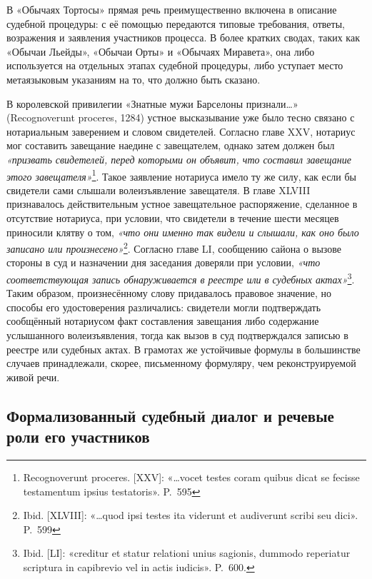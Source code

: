 В «Обычаях Тортосы» прямая речь преимущественно включена в описание судебной процедуры: с её помощью передаются типовые требования, ответы, возражения и заявления участников процесса. В более кратких сводах, таких как «Обычаи Льейды», «Обычаи Орты» и «Обычаях Миравета», она либо используется на отдельных этапах судебной процедуры, либо уступает место метаязыковым указаниям на то, что должно быть сказано.

В королевской привилегии «Знатные мужи Барселоны признали…» (Recognoverunt proceres, 1284) устное высказывание уже было тесно связано с нотариальным заверением и словом свидетелей. Согласно главе XXV, нотариус мог составить завещание наедине с завещателем, однако затем должен был \emph{«призвать свидетелей, перед которыми он объявит, что составил завещание этого завещателя»}\footnote{Recognoverunt proceres. [XXV]: «…vocet testes coram quibus dicat se fecisse testamentum ipsius testatoris». P.~595}. Такое заявление нотариуса имело ту же силу, как если бы свидетели сами слышали волеизъявление завещателя. В главе XLVIII признавалось действительным устное завещательное распоряжение, сделанное в отсутствие нотариуса, при условии, что свидетели в течение шести месяцев приносили клятву о том, \emph{«что они именно так видели и слышали, как оно было записано или произнесено»}\footnote{Ibid. [XLVIII]: «…quod ipsi testes ita viderunt et audiverunt scribi seu dici». P.~599}. Согласно главе LI, сообщению сайона о вызове стороны в суд и назначении дня заседания доверяли при условии, \emph{«что соответствующая запись обнаруживается в реестре или в судебных актах»}\footnote{Ibid. [LI]: «creditur et statur relationi unius sagionis, dummodo reperiatur scriptura in capibrevio vel in actis iudicis». P.~600.}. Таким образом, произнесённому слову придавалось правовое значение, но способы его удостоверения различались: свидетели могли подтверждать сообщённый нотариусом факт составления завещания либо содержание услышанного волеизъявления, тогда как вызов в суд подтверждался записью в реестре или судебных актах. В грамотах же устойчивые формулы в большинстве случаев принадлежали, скорее, письменному формуляру, чем реконструируемой живой речи.

\subsection{Формализованный судебный диалог и речевые роли его участников}


